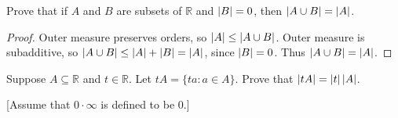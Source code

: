 \begin{exercise}\label{chapter2:sectionA:exercise1}
    Prove that if $A$ and $B$ are subsets of $\mathbb{R}$ and $\left\vert{B}\right\vert = 0$, then $\left\vert{A\cup B}\right\vert = \left\vert{A}\right\vert$.
\end{exercise}

\begin{proof}
    Outer measure preserves orders, so $\left\vert{A}\right\vert\leq\left\vert{A\cup B}\right\vert$. Outer measure is subadditive, so $\left\vert{A\cup B}\right\vert\leq \left\vert{A}\right\vert + \left\vert{B}\right\vert = \left\vert{A}\right\vert$, since $\left\vert{B}\right\vert = 0$. Thus $\left\vert{A\cup B}\right\vert = \left\vert{A}\right\vert$.
\end{proof}
\newpage

\begin{exercise}\label{chapter2:sectionA:exercise2}
    Suppose $A\subseteq \mathbb{R}$ and $t\in\mathbb{R}$. Let $tA = \{ ta: a\in A \}$. Prove that $\left\vert{tA}\right\vert = \left\vert{t}\right\vert\left\vert{A}\right\vert$.

        [Assume that $0\cdot\infty$ is defined to be $0$.]
\end{exercise}

